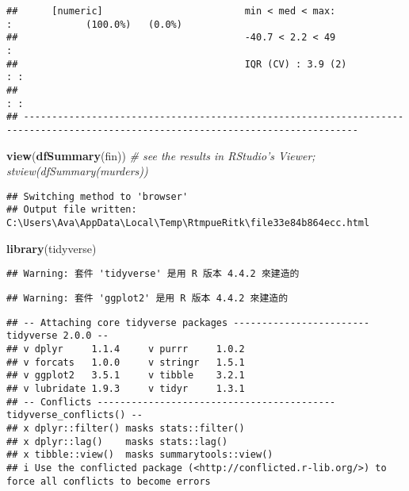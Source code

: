 \documentclass[
]{article}
\newenvironment{Shaded}{\begin{snugshade}}{\end{snugshade}}
\newcommand{\CommentTok}[1]{\textcolor[rgb]{0.56,0.35,0.01}{\textit{#1}}}
\newcommand{\FunctionTok}[1]{\textcolor[rgb]{0.13,0.29,0.53}{\textbf{#1}}}
\newcommand{\NormalTok}[1]{#1}
\begin{document}
\begin{verbatim}
##      [numeric]                         min < med < max:                                        :             (100.0%)   (0.0%)   
##                                        -40.7 < 2.2 < 49                                        :                                 
##                                        IQR (CV) : 3.9 (2)                                      : :                               
##                                                                                                : :                               
## ---------------------------------------------------------------------------------------------------------------------------------
\end{verbatim}

\begin{Shaded}
\begin{Highlighting}[]
\FunctionTok{view}\NormalTok{(}\FunctionTok{dfSummary}\NormalTok{(fin)) }\CommentTok{\# see the results in RStudio’s Viewer; stview(dfSummary(murders))}
\end{Highlighting}
\end{Shaded}

\begin{verbatim}
## Switching method to 'browser'
## Output file written: C:\Users\Ava\AppData\Local\Temp\RtmpueRitk\file33e84b864ecc.html
\end{verbatim}

\begin{Shaded}
\begin{Highlighting}[]
\FunctionTok{library}\NormalTok{(tidyverse)}
\end{Highlighting}
\end{Shaded}

\begin{verbatim}
## Warning: 套件 'tidyverse' 是用 R 版本 4.4.2 來建造的
\end{verbatim}

\begin{verbatim}
## Warning: 套件 'ggplot2' 是用 R 版本 4.4.2 來建造的
\end{verbatim}

\begin{verbatim}
## -- Attaching core tidyverse packages ------------------------ tidyverse 2.0.0 --
## v dplyr     1.1.4     v purrr     1.0.2
## v forcats   1.0.0     v stringr   1.5.1
## v ggplot2   3.5.1     v tibble    3.2.1
## v lubridate 1.9.3     v tidyr     1.3.1
## -- Conflicts ------------------------------------------ tidyverse_conflicts() --
## x dplyr::filter() masks stats::filter()
## x dplyr::lag()    masks stats::lag()
## x tibble::view()  masks summarytools::view()
## i Use the conflicted package (<http://conflicted.r-lib.org/>) to force all conflicts to become errors
\end{verbatim}
\end{document}
